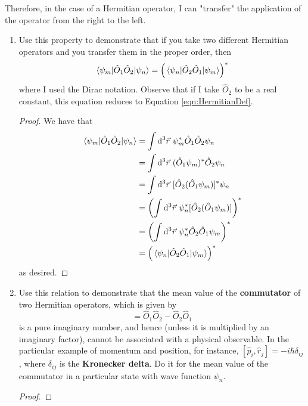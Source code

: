 \documentclass[../psets.tex]{subfiles}
\begin{document}
\begin{enumerate}
    Therefore, in the case of a Hermitian operator, I can "transfer" the application of the operator from the right to the left.
    \begin{enumerate}
        \item Use this property to demonstrate that if you take two different Hermitian operators
        and you transfer them in the proper order, then
        \begin{equation*}
            \mel{\psi_m}{\hat{O}_1\hat{O}_2}{\psi_n} = \left( \mel{\psi_n}{\hat{O}_2\hat{O}_1}{\psi_m} \right)^*
        \end{equation*}
        where I used the Dirac notation. Observe that if I take $\hat{O}_2$ to be a real constant, this equation reduces to Equation \ref{eqn:HermitianDef}.
        \begin{proof}
            We have that
            \begin{align*}
                \mel{\psi_m}{\hat{O}_1\hat{O}_2}{\psi_n} &= \int\dd^3\vec{r}\ \psi_m^*\hat{O}_1\hat{O}_2\psi_n\\
                &= \int\dd^3\vec{r}\ (\hat{O}_1\psi_m)^*\hat{O}_2\psi_n\\
                &= \int\dd^3\vec{r}\ [\hat{O}_2(\hat{O}_1\psi_m)]^*\psi_n\\
                &= \left( \int\dd^3\vec{r}\ \psi_n^*[\hat{O}_2(\hat{O}_1\psi_m)] \right)^*\\
                &= \left( \int\dd^3\vec{r}\ \psi_n^*\hat{O}_2\hat{O}_1\psi_m \right)^*\\
                &= \left( \mel{\psi_n}{\hat{O}_2\hat{O}_1}{\psi_m} \right)^*
            \end{align*}
            as desired.
        \end{proof}
        \item Use this relation to demonstrate that the mean value of the \textbf{commutator} of two Hermitian operators, which is given by
        \begin{equation*}
            [\hat{O}_1,\hat{O}_2] = \hat{O}_1\hat{O}_2-\hat{O}_2\hat{O}_1
        \end{equation*}
        is a pure imaginary number, and hence (unless it is multiplied by an imaginary factor), cannot be associated with a physical observable. In the particular example of momentum and position, for instance, $[\hat{p}_i,\hat{r}_j]=-i\hbar\delta_{ij}$, where $\delta_{ij}$ is the \textbf{Kronecker delta}. Do it for the mean value of the commutator in a particular state with wave function $\psi_n$.
        \begin{proof}

\end{proof}
\end{enumerate}
\end{enumerate}
\end{document}

